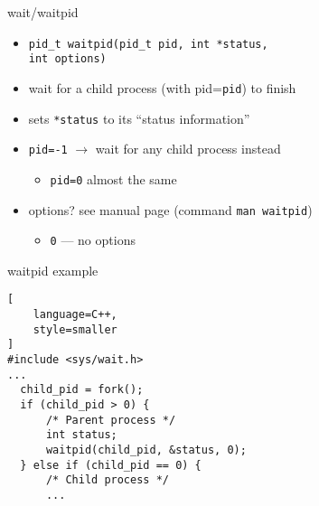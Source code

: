 \begin{frame}{wait/waitpid}
\begin{itemize}
\item \texttt{pid\_t waitpid(pid\_t pid, int *status, \\
              \hspace{5cm} int options)}
\item wait for a child process (with pid=\texttt{pid}) to finish
\item sets \texttt{*status} to its ``status information''
\vspace{.5cm}
\item \texttt{pid=-1} $\rightarrow$ wait for any child process instead
    \begin{itemize}
    \item \texttt{pid=0} almost the same
    \end{itemize}
\item options? see manual page (command \texttt{man waitpid})
    \begin{itemize}
        \item \texttt{0} --- no options
    \end{itemize}
\end{itemize}
\end{frame}

\begin{frame}[fragile,label=waitpidExample]{waitpid example}
\begin{lstlisting}[
    language=C++,
    style=smaller
]
#include <sys/wait.h>
...
  child_pid = fork();
  if (child_pid > 0) {
      /* Parent process */
      int status;
      waitpid(child_pid, &status, 0);
  } else if (child_pid == 0) {
      /* Child process */
      ...
\end{lstlisting}
\end{frame}

